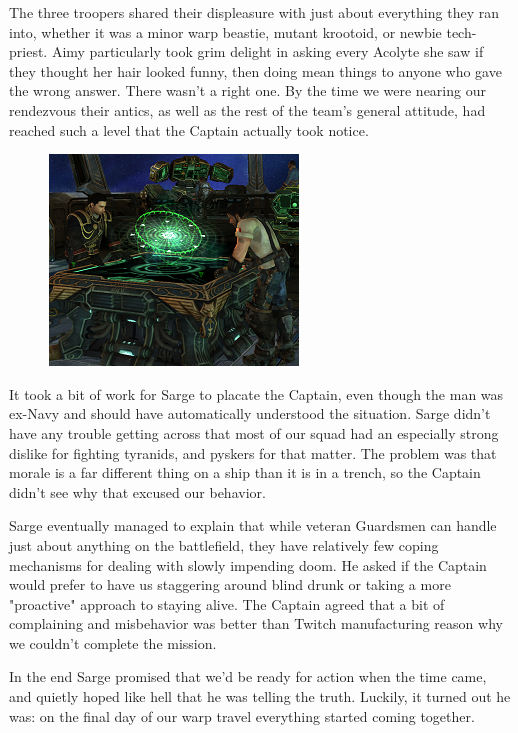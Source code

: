 The three troopers shared their displeasure with just about everything they ran into, whether it was a minor warp beastie, mutant krootoid, or newbie tech-priest. 
Aimy particularly took grim delight in asking every Acolyte she saw if they thought her hair looked funny, then doing mean things to anyone who gave the wrong answer. 
There wasn't a right one. 
By the time we were nearing our rendezvous their antics, as well as the rest of the team's general attitude, had reached such a level that the Captain actually took notice. 

\begin{figure}
	\begin{center}
		\includegraphics[width=\figwidth]{pics/12/11.png}
	\end{center}
\end{figure}
It took a bit of work for Sarge to placate the Captain, even though the man was ex-Navy and should have automatically understood the situation. 
Sarge didn't have any trouble getting across that most of our squad had an especially strong dislike for fighting tyranids, and pyskers for that matter. 
The problem was that morale is a far different thing on a ship than it is in a trench, so the Captain didn't see why that excused our behavior.

Sarge eventually managed to explain that while veteran Guardsmen can handle just about anything on the battlefield, they have relatively few coping mechanisms for dealing with slowly impending doom. 
He asked if the Captain would prefer to have us staggering around blind drunk or taking a more "proactive" approach to staying alive. 
The Captain agreed that a bit of complaining and misbehavior was better than Twitch manufacturing reason why we couldn't complete the mission.

In the end Sarge promised that we'd be ready for action when the time came, and quietly hoped like hell that he was telling the truth. 
Luckily, it turned out he was: 
on the final day of our warp travel everything started coming together.

